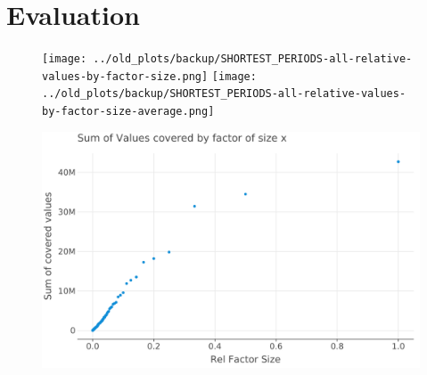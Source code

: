 
\chapter{Evaluation}
\label{ch:Evaluation}

\begin{figure}[h]
	\texttt{[image: ../old\_plots/backup/SHORTEST\_PERIODS-all-relative-values-by-factor-size.png]}
	\texttt{[image: ../old\_plots/backup/SHORTEST\_PERIODS-all-relative-values-by-factor-size-average.png]}
\end{figure}
\begin{figure}
	\includegraphics[width=\linewidth]{../plots/GREEDY_SHORT_FACTORS-all-values-by-factor-size.png}
\end{figure}


